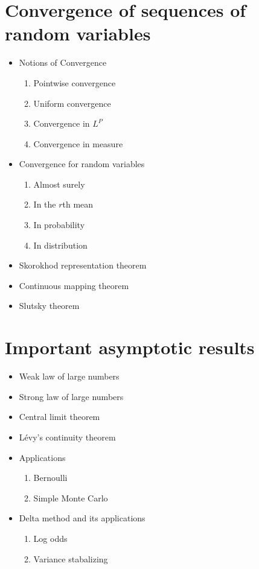 \documentclass{report}
\begin{document}
\section{Convergence of sequences of random variables}

\begin{itemize}
    \item Notions of Convergence
        \begin{enumerate}
            \item Pointwise convergence
            \item Uniform convergence
            \item Convergence in $L^P$
            \item Convergence in measure
        \end{enumerate}
    \item Convergence for random variables
        \begin{enumerate}
            \item Almost surely
            \item In the $r$th mean
            \item In probability
            \item In distribution
        \end{enumerate}
    \item Skorokhod representation theorem
    \item Continuous mapping theorem
    \item Slutsky theorem
\end{itemize}

\section{Important asymptotic results}

\begin{itemize}
    \item Weak law of large numbers
    \item Strong law of large numbers
    \item Central limit theorem
    \item Lévy's continuity theorem
    \item Applications
        \begin{enumerate}
            \item Bernoulli
            \item Simple Monte Carlo
        \end{enumerate}
    \item Delta method and its applications
        \begin{enumerate}
            \item Log odds
            \item Variance stabalizing
        \end{enumerate}
\end{itemize}
\end{document}
